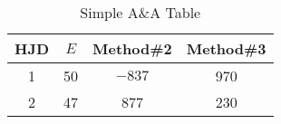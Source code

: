 \documentclass{aa}
\begin{document}
\begin{table}[h!]
\caption{Simple A\&A Table}                 %
\label{table:1}    %
\centering                        %
\begin{tabular}{c c c c}      %
\\ \hline\hline               %
HJD & $E$ & Method\#2 & Method\#3 \\         %
\hline                      %
   1 & 50 & $-837$ & 970 \\    %
   2 & 47 & 877    & 230 \\
\hline                                  %
\end{tabular}
\end{table}
\end{document}
